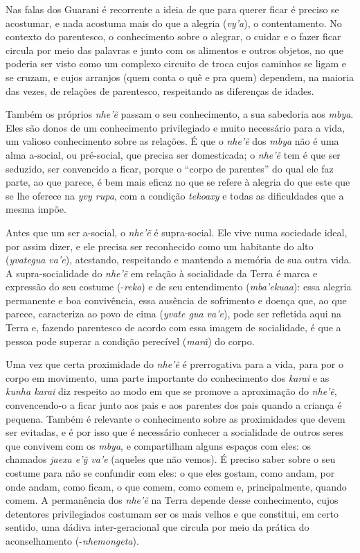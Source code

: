 Nas falas dos Guarani é recorrente a ideia de que para querer ficar é
preciso se acostumar, e nada acostuma mais do que a alegria (\emph{vy’a}), o
contentamento. No contexto do parentesco, o conhecimento sobre o
alegrar, o cuidar e o fazer ficar circula por meio das palavras e junto
com os alimentos e outros objetos, no que poderia ser visto como um
complexo circuito de troca cujos caminhos se ligam e se cruzam, e cujos
arranjos (quem conta o quê e pra quem) dependem, na maioria das vezes,
de relações de parentesco, respeitando as diferenças de idades.

Também os próprios \emph{nhe’ẽ} passam o seu conhecimento, a sua
sabedoria aos \emph{mbya}. Eles são donos de um conhecimento privilegiado e
muito necessário para a vida, um valioso conhecimento sobre as
relações. É que o \emph{nhe’ẽ} dos \emph{mbya} não é uma alma a-social, ou
pré-social, que precisa ser domesticada; o \emph{nhe’ẽ} tem é que ser
seduzido, ser convencido a ficar, porque o ``corpo de parentes'' do qual
ele faz parte, ao que parece, é bem mais eficaz no que se refere à
alegria do que este que se lhe oferece na \emph{yvy rupa}, com a condição
\emph{tekoaxy} e todas as dificuldades que a mesma impõe.

Antes que um ser a-social, o \emph{nhe’ẽ} é supra-social. Ele vive numa
sociedade ideal, por assim dizer, e ele precisa ser reconhecido como um
habitante do alto (\emph{yvategua va’e}), atestando, respeitando e mantendo a
memória de sua outra vida. A supra-socialidade do \emph{nhe’ẽ} em
relação à socialidade da Terra é marca e expressão do seu costume
(-\emph{reko}) e de seu entendimento (\emph{mba’ekuaa}): essa alegria permanente e
boa convivência, essa ausência de sofrimento e doença que, ao que
parece, caracteriza ao povo de cima (\emph{yvate gua va’e}), pode ser
refletida aqui na Terra e, fazendo parentesco de acordo com essa imagem
de socialidade, é que a pessoa pode superar a condição perecível (\emph{marã})
do corpo.

Uma vez que certa proximidade do \emph{nhe’ẽ} é prerrogativa para a vida,
para por o corpo em movimento, uma parte importante do conhecimento dos
\emph{karai} e as \emph{kunha karai} diz respeito ao modo em que se promove a
aproximação do \emph{nhe’ẽ}, convencendo-o a ficar junto aos pais e aos
parentes dos pais quando a criança é pequena. Também é relevante o
conhecimento sobre as proximidades que devem ser evitadas, e é por isso
que é necessário conhecer a socialidade de outros seres que convivem
com os \emph{mbya}, e compartilham alguns espaços com eles: os chamados \emph{jaexa
e’ỹ va’e} (aqueles que não vemos). É preciso saber sobre o seu
costume para não se confundir com eles: o que eles gostam, como andam,
por onde andam, como ficam, o que comem, como comem e, principalmente,
quando comem. A permanência dos \emph{nhe’ẽ} na Terra depende desse
conhecimento, cujos detentores privilegiados costumam ser os mais
velhos e que constitui, em certo sentido, uma dádiva inter-geracional
que circula por meio da prática do aconselhamento (-\emph{nhemongeta}).

